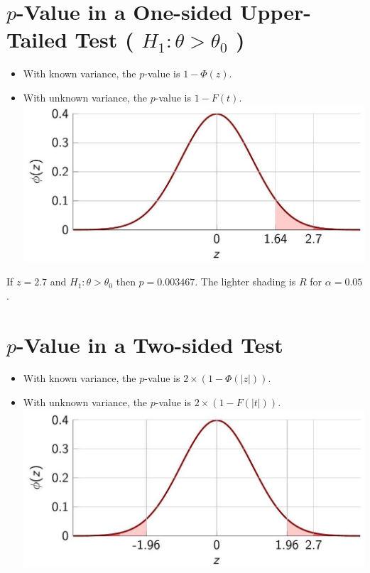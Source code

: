 \documentclass[10pt]{article}
\begin{document}
\section*{$p$-Value in a One-sided Upper-Tailed Test ( $H_{1}: \theta>\theta_{0}$ )}
\begin{itemize}
  \item With known variance, the $p$-value is $1-\Phi(z)$.
  \item With unknown variance, the $p$-value is $1-F(t)$.\\
\includegraphics[max width=\textwidth, center]{2025_05_12_2c033a5f0417cd8b136fg-51}
\end{itemize}

If $z=2.7$ and $H_{1}: \theta>\theta_{0}$ then $p=0.003467$. The lighter shading is $R$ for $\alpha=0.05$.

\section*{$p$-Value in a Two-sided Test}
\begin{itemize}
  \item With known variance, the $p$-value is $2 \times(1-\Phi(|z|))$.
  \item With unknown variance, the $p$-value is $2 \times(1-F(|t|))$.\\
\includegraphics[max width=\textwidth, center]{2025_05_12_2c033a5f0417cd8b136fg-52}
\end{itemize}
\end{document}
